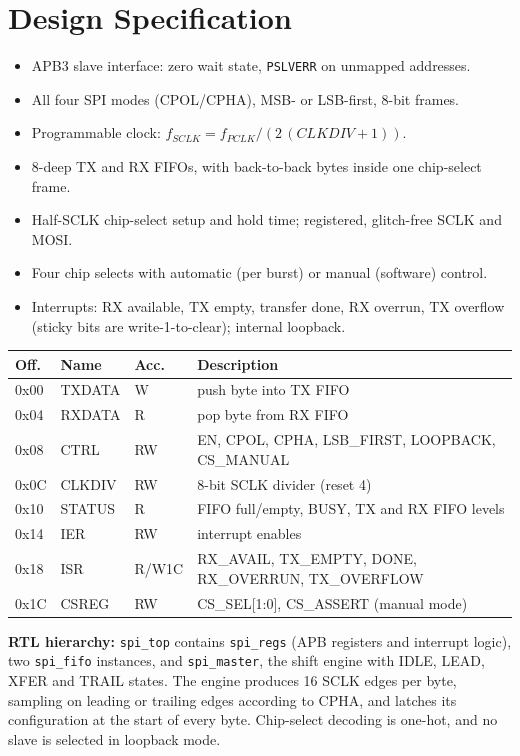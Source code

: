 \documentclass[11pt,a4paper]{article}
\newcommand{\sect}[1]{\section{\textcolor{accent}{#1}}}
\begin{document}
\sect{Design Specification}
\begin{itemize}
\item APB3 slave interface: zero wait state, \texttt{PSLVERR} on unmapped addresses.
\item All four SPI modes (CPOL/CPHA), MSB- or LSB-first, 8-bit frames.
\item Programmable clock: $f_{SCLK} = f_{PCLK} / (2\,(CLKDIV+1))$.
\item 8-deep TX and RX FIFOs, with back-to-back bytes inside one chip-select frame.
\item Half-SCLK chip-select setup and hold time; registered, glitch-free SCLK and MOSI.
\item Four chip selects with automatic (per burst) or manual (software) control.
\item Interrupts: RX available, TX empty, transfer done, RX overrun, TX overflow (sticky bits are write-1-to-clear); internal loopback.
\end{itemize}

\begin{center}
\small
\begin{tabular}{lllp{9.2cm}}
\toprule
\textbf{Off.} & \textbf{Name} & \textbf{Acc.} & \textbf{Description}\\
\midrule
0x00 & TXDATA & W & push byte into TX FIFO \\
0x04 & RXDATA & R & pop byte from RX FIFO \\
0x08 & CTRL & RW & EN, CPOL, CPHA, LSB\_FIRST, LOOPBACK, CS\_MANUAL \\
0x0C & CLKDIV & RW & 8-bit SCLK divider (reset 4) \\
0x10 & STATUS & R & FIFO full/empty, BUSY, TX and RX FIFO levels \\
0x14 & IER & RW & interrupt enables \\
0x18 & ISR & R/W1C & RX\_AVAIL, TX\_EMPTY, DONE, RX\_OVERRUN, TX\_OVERFLOW \\
0x1C & CSREG & RW & CS\_SEL[1:0], CS\_ASSERT (manual mode) \\
\bottomrule
\end{tabular}
\end{center}

\textbf{RTL hierarchy:} \texttt{spi\_top} contains \texttt{spi\_regs} (APB registers and interrupt logic), two \texttt{spi\_fifo} instances, and \texttt{spi\_master}, the shift engine with IDLE, LEAD, XFER and TRAIL states. The engine produces 16 SCLK edges per byte, sampling on leading or trailing edges according to CPHA, and latches its configuration at the start of every byte. Chip-select decoding is one-hot, and no slave is selected in loopback mode.
\end{document}
